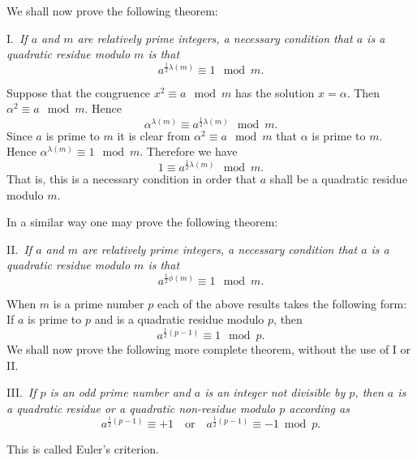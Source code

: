\documentclass[oneside]{book}
\begin{document}
We shall now prove the following theorem:

\smallskip I.~\emph{If $a$ and $m$ are relatively prime integers, a
necessary condition that $a$ is a quadratic residue modulo $m$ is
that}
\begin{equation*}
a^{\frac{1}{2}\lambda(m)} \equiv 1 \mod m.
\end{equation*}

Suppose that the congruence $x^2 \equiv a \mod m$ has the solution $x =
\alpha$. Then $\alpha^2 \equiv a \mod m$. Hence
\begin{equation*}
\alpha^{\lambda(m)} \equiv a^{\frac{1}{2}\lambda(m)} \mod m.
\end{equation*}
Since $a$ is prime to $m$ it is clear from $\alpha^2 \equiv a \mod
m$ that $\alpha$ is prime to $m$. Hence $\alpha^{\lambda(m)} \equiv 1
\mod m$. Therefore we have
\begin{equation*}
1 \equiv a^{\frac{1}{2}\lambda(m)} \mod m.
\end{equation*}
That is, this is a necessary condition in order that $a$ shall be a
quadratic residue modulo $m$.

In a similar way one may prove the following theorem:

\smallskip II.~\emph{If $a$ and $m$ are relatively prime integers, a
necessary condition that $a$ is a quadratic residue modulo $m$ is
that}
\begin{equation*}
a^{\frac{1}{2}\phi(m)} \equiv 1 \mod m.
\end{equation*}

When $m$ is a prime number $p$ each of the above results takes the
following form: If $a$ is prime to $p$ and is a quadratic residue
modulo $p$, then
\begin{equation*}
a^{\frac{1}{2}(p-1)} \equiv 1 \mod p.
\end{equation*}
We shall now prove the following more complete theorem, without the
use of I or II.

\smallskip III.~\emph{If $p$ is an odd prime number and $a$ is an
integer not divisible by $p$, then $a$ is a quadratic residue or a
quadratic non-residue modulo $p$ according as}
\begin{equation*}
a^{\tfrac{1}{2}(p-1)} \equiv +1 \quad \text{or} \quad
a^{\tfrac{1}{2}(p-1)} \equiv -1 \bmod p.
\end{equation*}

This is called Euler's criterion.
\end{document}

